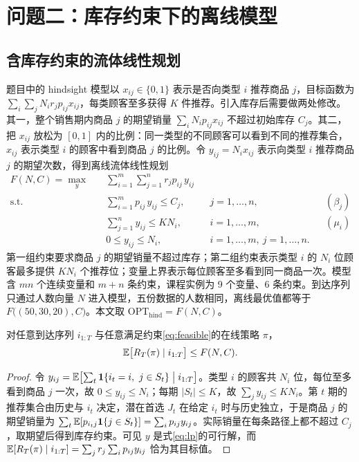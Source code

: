 \section{问题二：库存约束下的离线模型}\label{sec:q2}

\subsection{含库存约束的流体线性规划}
题目中的 hindsight 模型以 $x_{ij}\in\{0,1\}$ 表示是否向类型 $i$ 推荐商品 $j$，目标函数为 $\sum_i\sum_jN_ir_jp_{ij}x_{ij}$，每类顾客至多获得 $K$ 件推荐。引入库存后需要做两处修改。其一，整个销售期内商品 $j$ 的期望销量 $\sum_iN_ip_{ij}x_{ij}$ 不超过初始库存 $C_j$。其二，把 $x_{ij}$ 放松为 $[0,1]$ 内的比例：同一类型的不同顾客可以看到不同的推荐集合，$x_{ij}$ 表示类型 $i$ 的顾客中看到商品 $j$ 的比例。令 $y_{ij}=N_ix_{ij}$ 表示向类型 $i$ 推荐商品 $j$ 的期望次数，得到离线流体线性规划
\begin{equation}
\begin{aligned}
F(N,C)=\max_{y}\quad &\sum_{i=1}^{m}\sum_{j=1}^{n}r_jp_{ij}\,y_{ij}\\
\mathrm{s.t.}\quad &\sum_{i=1}^{m}p_{ij}\,y_{ij}\le C_j, &&j=1,\ldots,n, &&(\beta_j)\\
&\sum_{j=1}^{n}y_{ij}\le K N_i, &&i=1,\ldots,m, &&(\mu_i)\\
&0\le y_{ij}\le N_i, &&i=1,\ldots,m,\ j=1,\ldots,n.
\end{aligned}
\label{eq:lp}
\end{equation}
第一组约束要求商品 $j$ 的期望销量不超过库存；第二组约束表示类型 $i$ 的 $N_i$ 位顾客最多提供 $KN_i$ 个推荐位；变量上界表示每位顾客至多看到同一商品一次。模型含 $mn$ 个连续变量和 $m+n$ 条约束，课程实例为 9 个变量、6 条约束。到达序列只通过人数向量 $N$ 进入模型，五份数据的人数相同，离线最优值都等于 $F\bigl((50,30,20),C\bigr)$。本文取 $\mathrm{OPT}_{\mathrm{hind}}=F(N,C)$。

\begin{proposition}\label{prop:upper}
对任意到达序列 $i_{1:T}$ 与任意满足约束\eqref{eq:feasible}的在线策略 $\pi$，
\begin{equation}
\mathbb E\bigl[R_T(\pi)\mid i_{1:T}\bigr]\le F(N,C).
\label{eq:upper}
\end{equation}
\end{proposition}
\begin{proof}
令 $y_{ij}=\mathbb E\bigl[\sum_{t}\mathbf 1\{i_t=i,\ j\in S_t\}\bigm| i_{1:T}\bigr]$。类型 $i$ 的顾客共 $N_i$ 位，每位至多看到商品 $j$ 一次，故 $0\le y_{ij}\le N_i$；每期 $|S_t|\le K$，故 $\sum_jy_{ij}\le KN_i$。第 $t$ 期的推荐集合由历史与 $i_t$ 决定，潜在首选 $J_t$ 在给定 $i_t$ 时与历史独立，于是商品 $j$ 的期望销量为 $\sum_t\mathbb E[p_{i_tj}\mathbf 1\{j\in S_t\}]=\sum_ip_{ij}y_{ij}$。实际销量在每条路径上都不超过 $C_j$，取期望后得到库存约束。可见 $y$ 是式\eqref{eq:lp}的可行解，而 $\mathbb E[R_T(\pi)\mid i_{1:T}]=\sum_jr_j\sum_ip_{ij}y_{ij}$ 恰为其目标值。
\end{proof}

